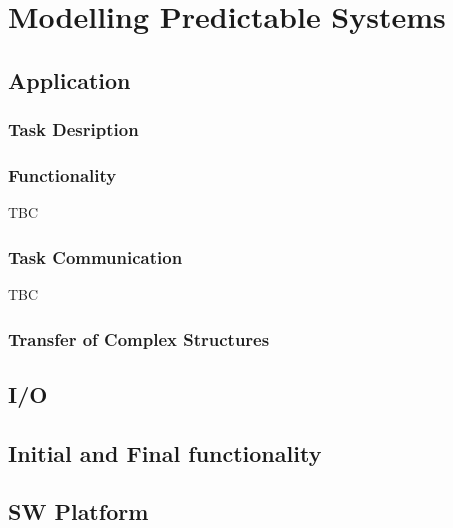 \documentclass{article}
\begin{document}


\section{Modelling Predictable Systems}
\label{sec:mod_pred}

\subsection{Application}
\label{sec:application}



\subsubsection{Task Desription}
\label{sec:task_description}



\subsubsection{Functionality}
\label{sec:func}
TBC

\subsubsection{Task Communication}
\label{sec:app_comm}
TBC

\subsubsection{Transfer of Complex Structures}
\label{sec:app_complex_structures}



\subsection{I/O}
\label{sec:io}

\subsection{Initial and Final functionality}
\label{sec:app_initialization}



\subsection{SW Platform}
\label{sec:sw_platform}
\end{document}

